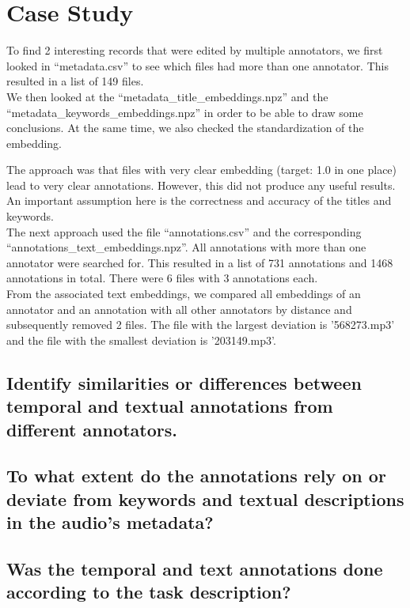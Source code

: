 
\section{Case Study}
\label{sec:Case Study}

To find 2 interesting records that were edited by multiple annotators, 
we first looked in ``metadata.csv'' to see which files had more than one annotator. 
This resulted in a list of 149 files. \\
We then looked at the ``metadata\_title\_embeddings.npz'' and the ``metadata\_keywords\_embeddings.npz'' in order 
to be able to draw some conclusions. 
At the same time, we also checked the standardization of the embedding. 

The approach was that files with very clear embedding (target: 1.0 in one place) lead to very clear annotations. 
However, this did not produce any useful results. \\

An important assumption here is the correctness and accuracy of the titles and keywords. \\


The next approach used the file ``annotations.csv'' and the corresponding ``annotations\_text\_embeddings.npz''. 
All annotations with more than one annotator were searched for. 
This resulted in a list of 731 annotations and 1468 annotations in total. There were 6 files with 3 annotations each. \\

From the associated text embeddings, we compared all embeddings of an annotator and an annotation with all other annotators by distance and subsequently removed 2 files.
The file with the largest deviation is '568273.mp3' and the file with the smallest deviation is '203149.mp3'.


\subsection{Identify similarities or differences between temporal and textual annotations from different annotators.}
\label{sec:Case Study:a}



\subsection{To what extent do the annotations rely on or deviate from keywords and textual descriptions in the audio’s metadata?}
\label{sec:Case Study:b}



\subsection{Was the temporal and text annotations done according to the task description?}
\label{sec:Case Study:c}




